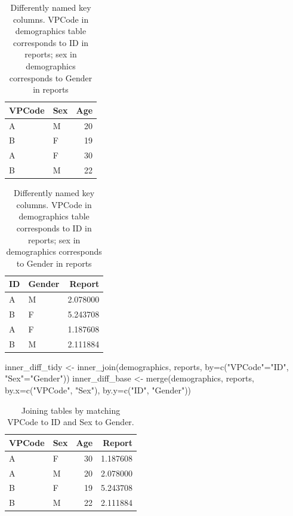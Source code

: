 \documentclass[
]{book}
\newenvironment{Shaded}{\begin{snugshade}}{\end{snugshade}}
\newcommand{\AttributeTok}[1]{\textcolor[rgb]{0.77,0.63,0.00}{#1}}
\newcommand{\FunctionTok}[1]{\textcolor[rgb]{0.00,0.00,0.00}{#1}}
\newcommand{\NormalTok}[1]{#1}
\newcommand{\OtherTok}[1]{\textcolor[rgb]{0.56,0.35,0.01}{#1}}
\newcommand{\StringTok}[1]{\textcolor[rgb]{0.31,0.60,0.02}{#1}}
\begin{document}
\begin{table}
\caption{\label{tab:unnamed-chunk-193}Differently named key columns. VPCode in demographics table corresponds to ID in reports; sex in demographics corresponds to Gender in reports}

\centering
\begin{tabular}[t]{l|l|r}
\hline
VPCode & Sex & Age\\
\hline
A & M & 20\\
\hline
B & F & 19\\
\hline
A & F & 30\\
\hline
B & M & 22\\
\hline
\end{tabular}
\centering
\begin{tabular}[t]{l|l|r}
\hline
ID & Gender & Report\\
\hline
A & M & 2.078000\\
\hline
B & F & 5.243708\\
\hline
A & F & 1.187608\\
\hline
B & M & 2.111884\\
\hline
\end{tabular}
\end{table}

\begin{Shaded}
\begin{Highlighting}[]
\NormalTok{inner\_diff\_tidy }\OtherTok{\textless{}{-}} \FunctionTok{inner\_join}\NormalTok{(demographics, reports, }\AttributeTok{by=}\FunctionTok{c}\NormalTok{(}\StringTok{"VPCode"}\OtherTok{=}\StringTok{"ID"}\NormalTok{, }\StringTok{"Sex"}\OtherTok{=}\StringTok{"Gender"}\NormalTok{))}
\NormalTok{inner\_diff\_base }\OtherTok{\textless{}{-}} \FunctionTok{merge}\NormalTok{(demographics, reports, }\AttributeTok{by.x=}\FunctionTok{c}\NormalTok{(}\StringTok{"VPCode"}\NormalTok{, }\StringTok{"Sex"}\NormalTok{), }\AttributeTok{by.y=}\FunctionTok{c}\NormalTok{(}\StringTok{"ID"}\NormalTok{, }\StringTok{"Gender"}\NormalTok{))}
\end{Highlighting}
\end{Shaded}

\begin{table}

\caption{\label{tab:unnamed-chunk-195}Joining tables by matching VPCode to ID and Sex to Gender.}
\centering
\begin{tabular}[t]{l|l|r|r}
\hline
VPCode & Sex & Age & Report\\
\hline
A & F & 30 & 1.187608\\
\hline
A & M & 20 & 2.078000\\
\hline
B & F & 19 & 5.243708\\
\hline
B & M & 22 & 2.111884\\
\hline
\end{tabular}
\end{table}
\end{document}

